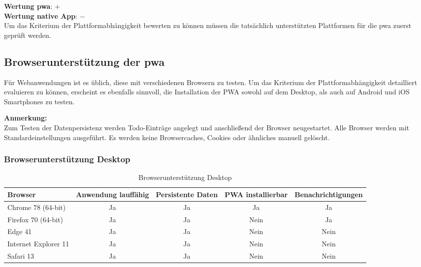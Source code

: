 \textbf{Wertung \ac{pwa}}: $+$ \\
\textbf{Wertung native App}: $-$  \\

Um das Kriterium der Plattformabhängigkeit bewerten zu können müssen die tatsächlich unterstützten Plattformen für die \ac{pwa} zuerst geprüft werden.

\subsection{Browserunterstützung der \acs{pwa}}
Für Webanwendungen ist es üblich, diese mit verschiedenen Browsern zu testen. Um das Kriterium der Plattformabhängigkeit detailliert evaluieren zu können, erscheint es ebenfalls sinnvoll, die Installation der PWA sowohl auf dem Desktop, als auch auf Android und iOS Smartphones zu testen.

\textbf{Anmerkung:}\\
Zum Testen der Datenpersistenz werden Todo-Einträge angelegt und anschließend der Browser neugestartet.
Alle Browser werden mit Standardeinstellungen ausgeführt. Es werden keine Browsercaches, Cookies oder ähnliches manuell gelöscht.

\subsubsection{Browserunterstützung Desktop}
\begin{table}[H]
	\centering
	\begin{tabularx}{\textwidth}{|l||C|C|C|c|}
		\hline
		Browser              & Anwendung lauffähig & Persistente Daten & PWA installierbar & Benachrichtigungen \\
		\hline
		Chrome 78 (64-bit)   & Ja                  & Ja                & Ja                & Ja                 \\
		Firefox 70 (64-bit)  & Ja                  & Ja                & Nein              & Ja                 \\
		Edge 41    & Ja                  & Ja                & Nein              & Nein               \\
		Internet Explorer 11 & Ja                  & Ja                & Nein              & Nein               \\
		Safari 13            & Ja                  & Ja                & Nein              & Nein               \\
		\hline
	\end{tabularx}
	\caption{Browserunterstützung Desktop} \label{tab:browser_desktop}
\end{table}

